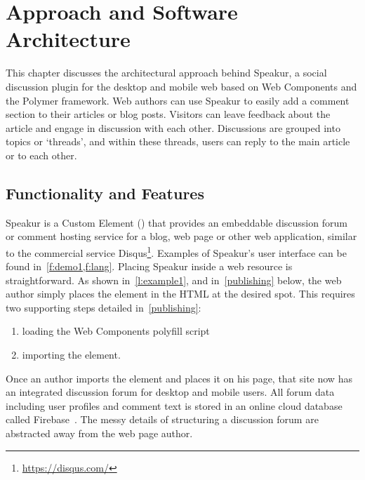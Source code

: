 \chapter{Approach and Software Architecture}
%
\label{ch:approach}

This chapter discusses the architectural approach behind Speakur, 
a social discussion plugin for the desktop and mobile web based on Web Components and the Polymer framework.
Web authors can use Speakur to easily add a comment section to their articles or blog posts.
Visitors can leave feedback about the article and engage in discussion with each other.
Discussions are grouped into topics or `threads', and within these threads, users can reply to the main article or to each other.

\section{Functionality and Features}
Speakur 
is a Custom Element 
() 
that provides an embeddable discussion forum or comment hosting service for a blog, web page or other web application, similar to the commercial service Disqus\footnote{\url{https://disqus.com/}}.
Examples of Speakur's user interface can be found in~\cref{f:demo1,f:lang}.
Placing Speakur inside a web resource is straightforward.
As shown in~\cref{l:example1},
and in~\cref{publishing} below,
the web author simply places the 
 element in the HTML at the desired spot.
This requires two supporting steps detailed in~\cref{publishing}:
\begin{enumerate}
\item loading the Web Components polyfill script
\item importing the  element.
\end{enumerate}

Once an author imports the element and places it on his page, that site now has an integrated discussion forum for desktop and mobile users. 
All forum data including user profiles and comment text is stored in an online cloud database called Firebase~\cite{firebasecontributors2015}.
The messy details of structuring a discussion forum are abstracted away from the web page author.

